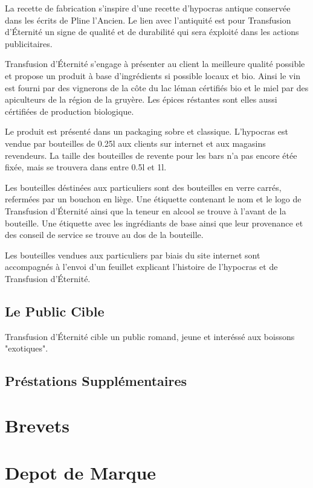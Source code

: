\documentclass[10pt,a4paper]{article}
\newcommand{\tde}{Transfusion d'Éternité}
\begin{document}
La recette de fabrication s'inspire d'une recette d'hypocras antique conservée dans les écrits de Pline l'Ancien.
Le lien avec l'antiquité est pour \tde{} un signe de qualité et de durabilité qui sera éxploité dans les actions publicitaires.

\tde{} s'engage à présenter au client la meilleure qualité possible et propose un produit à base d'ingrédients si possible locaux et bio.
Ainsi le vin est fourni par des vignerons de la côte du lac léman cértifiés bio et le miel par des apiculteurs de la région de la gruyère.
Les épices réstantes sont elles aussi cértifiées de production biologique.

Le produit est présenté dans un packaging sobre et classique.
L'hypocras est vendue par bouteilles de 0.25l aux clients sur internet et aux magasins revendeurs.
La taille des bouteilles de revente pour les bars n'a pas encore étée fixée, mais se trouvera dans entre 0.5l et 1l.

Les bouteilles déstinées aux particuliers sont des bouteilles en verre carrés, refermées par un bouchon en liège.
Une étiquette contenant le nom et le logo de \tde{} ainsi que la teneur en alcool se trouve à l'avant de la bouteille.
Une étiquette avec les ingrédiants de base ainsi que leur provenance et des conseil de service se trouve au dos de la bouteille.

Les bouteilles vendues aux particuliers par biais du site internet sont accompagnés à l'envoi d'un feuillet explicant l'histoire de l'hypocras et de \tde{}.

\subsection{Le Public Cible}
\tde{} cible un public romand, jeune et interéssé aux boissons "exotiques".
\subsection{Préstations Supplémentaires}

\section{Brevets}

\section{Depot de Marque}
\end{document}
